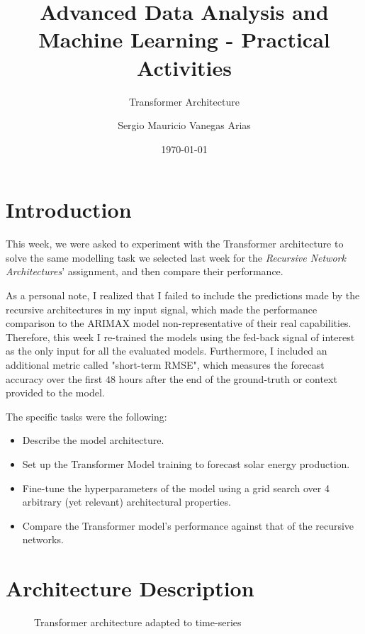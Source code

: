 \documentclass{scrartcl}
\title{Advanced Data Analysis and Machine Learning - Practical Activities}
\subtitle{Transformer Architecture}
\author{Sergio Mauricio Vanegas Arias}
\date{\today}
\begin{document}
  \maketitle

  \section{Introduction}

    This week, we were asked to experiment with the Transformer architecture\cite{vaswani2023attention} to solve the same modelling task we selected last week for the \emph{Recursive Network Architectures}' assignment, and then compare their performance.

    As a personal note, I realized that I failed to include the predictions made by the recursive architectures in my input signal, which made the performance comparison to the ARIMAX model non-representative of their real capabilities. Therefore, this week I re-trained the models using the fed-back signal of interest as the only input for all the evaluated models. Furthermore, I included an additional metric called "short-term RMSE", which measures the forecast accuracy over the first $48$ hours after the end of the ground-truth or context provided to the model.

    The specific tasks were the following:
    \begin{itemize}
      \item Describe the model architecture.
      \item Set up the Transformer Model training to forecast solar energy production.
      \item Fine-tune the hyperparameters of the model using a grid search over 4 arbitrary (yet relevant) architectural properties.
      \item Compare the Transformer model's performance against that of the recursive networks.
    \end{itemize}

  \section{Architecture Description}

    \begin{figure}[ht]
      \centering
      
      \caption{Transformer architecture adapted to time-series}
      \label{fig:transformer}
    \end{figure}
\end{document}
